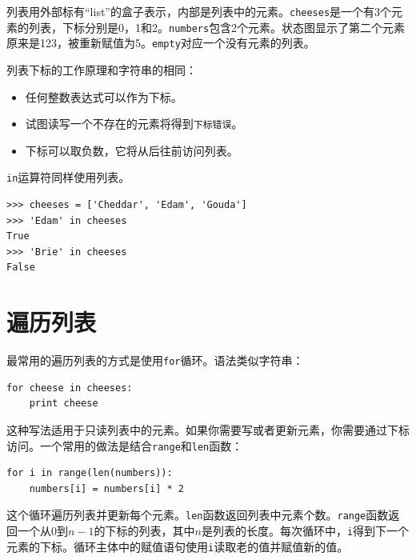 列表用外部标有“list”的盒子表示，内部是列表中的元素。{\tt cheeses}是一个有3个元素的列表，下标分别是0，1和2。{\tt numbers}包含2个元素。状态图显示了第二个元素原来是123，被重新赋值为5。{\tt empty}对应一个没有元素的列表。


列表下标的工作原理和字符串的相同：

\begin{itemize}

\item 任何整数表达式可以作为下标。

\item 试图读写一个不存在的元素将得到{\tt 下标错误}。


\item 下标可以取负数，它将从后往前访问列表。

\end{itemize}




{\tt in}运算符同样使用列表。

\beforeverb
\begin{verbatim}
>>> cheeses = ['Cheddar', 'Edam', 'Gouda']
>>> 'Edam' in cheeses
True
>>> 'Brie' in cheeses
False
\end{verbatim}
\afterverb


\section{遍历列表}

最常用的遍历列表的方式是使用{\tt for}循环。语法类似字符串：

\beforeverb
\begin{verbatim}
for cheese in cheeses:
    print cheese
\end{verbatim}
\afterverb
%
这种写法适用于只读列表中的元素。如果你需要写或者更新元素，你需要通过下标访问。一个常用的做法是结合{\tt range}和{\tt len}函数：


\beforeverb
\begin{verbatim}
for i in range(len(numbers)):
    numbers[i] = numbers[i] * 2
\end{verbatim}
\afterverb
%
这个循环遍历列表并更新每个元素。{\tt len}函数返回列表中元素个数。{\tt range}函数返回一个从0到$n-1$的下标的列表，其中$n$是列表的长度。每次循环中，{\tt i}得到下一个元素的下标。循环主体中的赋值语句使用{\tt i}读取老的值并赋值新的值。

